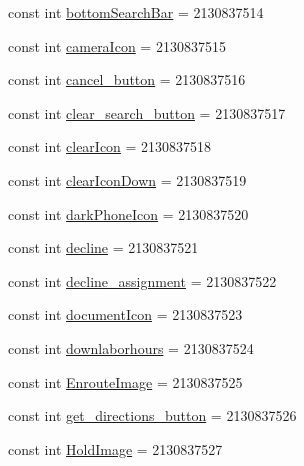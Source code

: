 \begin{DoxyCompactItemize}
\item 
const int \hyperlink{class_field_service_1_1_android_1_1_resource_1_1_drawable_a2535bdca316f028626b61a5cbf877046}{bottom\+Search\+Bar} = 2130837514
\item 
const int \hyperlink{class_field_service_1_1_android_1_1_resource_1_1_drawable_ae13023373d547825c349a0f9a646c94f}{camera\+Icon} = 2130837515
\item 
const int \hyperlink{class_field_service_1_1_android_1_1_resource_1_1_drawable_aae5e97cdff86cb0c3fd14ab2f6c14d12}{cancel\+\_\+button} = 2130837516
\item 
const int \hyperlink{class_field_service_1_1_android_1_1_resource_1_1_drawable_a875d433774f24ff30d9c6a04cb4a56ee}{clear\+\_\+search\+\_\+button} = 2130837517
\item 
const int \hyperlink{class_field_service_1_1_android_1_1_resource_1_1_drawable_a7ea389be7ca8506ff5b498292372692b}{clear\+Icon} = 2130837518
\item 
const int \hyperlink{class_field_service_1_1_android_1_1_resource_1_1_drawable_adbda9cb444c5510e1ccdc601025dfc40}{clear\+Icon\+Down} = 2130837519
\item 
const int \hyperlink{class_field_service_1_1_android_1_1_resource_1_1_drawable_a3d8be568390cf3ef6866a33efec05e3a}{dark\+Phone\+Icon} = 2130837520
\item 
const int \hyperlink{class_field_service_1_1_android_1_1_resource_1_1_drawable_a881e0c6373ea1a2777566b021bf23c27}{decline} = 2130837521
\item 
const int \hyperlink{class_field_service_1_1_android_1_1_resource_1_1_drawable_ad3b18723b8e8449cd90667d9cb6f6127}{decline\+\_\+assignment} = 2130837522
\item 
const int \hyperlink{class_field_service_1_1_android_1_1_resource_1_1_drawable_af951bd8e845ad06498324f2981df4ac3}{document\+Icon} = 2130837523
\item 
const int \hyperlink{class_field_service_1_1_android_1_1_resource_1_1_drawable_afb96f8ed99280ebb3c96d94ec6344bbc}{downlaborhours} = 2130837524
\item 
const int \hyperlink{class_field_service_1_1_android_1_1_resource_1_1_drawable_acdb1d3a194e6c9e4b0795f7ed5ad8995}{Enroute\+Image} = 2130837525
\item 
const int \hyperlink{class_field_service_1_1_android_1_1_resource_1_1_drawable_ae62dbe22eeddf962ab5bd2d9122496db}{get\+\_\+directions\+\_\+button} = 2130837526
\item 
const int \hyperlink{class_field_service_1_1_android_1_1_resource_1_1_drawable_a5c1856b0bc548df4576f7bdfeea6239c}{Hold\+Image} = 2130837527

\end{DoxyCompactItemize}
